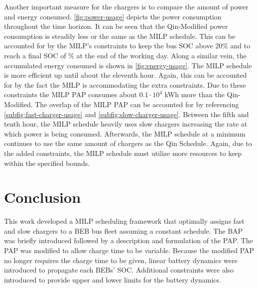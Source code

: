 \documentclass[utf8]{FrontiersinHarvard}
\newcommand{\bcharge}{0.7 }                                                     %
\newcommand{\mincharge}{20\% }                                                  %
\begin{document}
Another important measure for the chargers is to compare the amount of power and energy consumed.
\autoref{fig:power-usage} depicts the power consumption throughout the time horizon. It can be seen that the
Qin-Modified power consumption is steadily less or the same as the MILP schedule. This can be accounted for by the
MILP's constraints to keep the bus SOC above \mincharge and to reach a final SOC of \fpeval{\bcharge *100}\% at the end
of the working day. Along a similar vein, the accumulated energy consumed is shown in \autoref{fig:energy-usage}. The
MILP schedule is more efficient up until about the eleventh hour. Again, this can be accounted for by the fact the MILP
is accommodating the extra constraints. Due to these constraints the MILP PAP consumes about \(0.1\cdot10^4\) kWh more than
the Qin-Modified. The overlap of the MILP PAP can be accounted for by referencing \autoref{subfig:fast-charger-usage}
and \autoref{subfig:slow-charger-usage}. Between the fifth and tenth hour, the MILP schedule heavily uses slow chargers
increasing the rate at which power is being consumed. Afterwards, the MILP schedule at a minimum continues to use the
same amount of chargers as the Qin Schedule. Again, due to the added constraints, the MILP schedule must utilize more
resources to keep within the specified bounds.
\section{Conclusion}
\label{sec:conclusion}
This work developed a MILP scheduling framework that optimally assigns fast and slow chargers to a BEB bus fleet
assuming a constant schedule. The BAP was briefly introduced followed by a description and formulation of the PAP. The
PAP was modified to allow charge time to be variable. Because the modified PAP no longer requires the charge time to be
given, linear battery dynamics were introduced to propagate each BEBs' SOC. Additional constraints were also introduced
to provide upper and lower limits for the battery dynamics.
\end{document}

